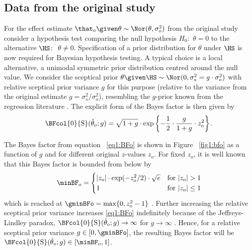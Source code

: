 \subsection{Data from the original study}
For the effect estimate $\that_o \given \theta \sim \Nor(\theta, \sigma^2_o)$
from the original study consider a hypothesis test comparing the null hypothesis
$H_0\colon$ $\theta = 0$ to the alternative $\HS \colon$ $\theta \neq 0$.
Specification of a prior distribution for $\theta$ under $\HS$ is now required
for Bayesian hypothesis testing. A typical choice \citep{Jeffreys1961} is a
local alternative, a unimodal symmetric prior distribution centred around the
null value. We consider the sceptical prior
$\theta \given \HS \sim \Nor(0, \sigma^2_s = g \cdot \sigma^2_o)$ with relative
sceptical prior variance $g$ for this purpose (relative to the variance from the
original estimate $g = \sigma^2_s/\sigma^2_o$), resembling the $g$-prior known
from the regression literature \citep{Zellner1986, Liang2008}. The explicit form
of the Bayes factor is then given by
\begin{align}
  \label{eq1:BFo}
  \BFcol{0}{\mathrm{S}}(\hat{\theta}_o; g)
  = \sqrt{1 + g} \cdot
  \exp\left\{-\frac{1}{2} \cdot \frac{g}{1 + g} \cdot z^2_o\right\}.
\end{align}

The Bayes factor from equation ~\eqref{eq1:BFo} is shown in Figure ~\ref{fig1:bfo}
as a function of $g$ and for different original $z$-values $z_o$. For fixed
$z_o$, it is well known that this Bayes factor is bounded from below by
\begin{align}
  \label{eq1:minBFo}
  \minBF_{o} =
  \begin{cases}
    |z_o| \cdot  \exp(-z_o^2/2) \cdot \sqrt{e} & \text{for} ~ |z_o| > 1 \\
    1 & \text{for} ~ |z_o| \leq 1
  \end{cases}
\end{align}
which is reached at $\gminBFo = \max\{0, z^2_o - 1\}$ \citep{Edwards1963}.
Further increasing the relative sceptical prior variance increases
\eqref{eq1:BFo} indefinitely because of the Jeffreys-Lindley paradox, \ie
$\BFcol{0}{\mathrm{S}}(\hat{\theta}_o; g) \to \infty$ for $g \to \infty$
\citep[][Section 6.1.4]{Bernardo2000}. Hence, for a relative sceptical prior
variance $g \in [0, \gminBFo]$, the resulting Bayes factor will be
$\BFcol{0}{\mathrm{S}}(\hat{\theta}_o; g) \in [\minBF_o, 1]$.

